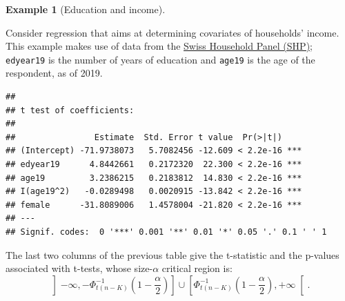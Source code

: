 \documentclass[
  12pt,
]{book}
\newenvironment{Shaded}{\begin{snugshade}}{\end{snugshade}}
\newcommand{\AttributeTok}[1]{\textcolor[rgb]{0.13,0.29,0.53}{#1}}
\newcommand{\DecValTok}[1]{\textcolor[rgb]{0.00,0.00,0.81}{#1}}
\newcommand{\FunctionTok}[1]{\textcolor[rgb]{0.13,0.29,0.53}{\textbf{#1}}}
\newcommand{\NormalTok}[1]{#1}
\newcommand{\OtherTok}[1]{\textcolor[rgb]{0.56,0.35,0.01}{#1}}
\newcommand{\SpecialCharTok}[1]{\textcolor[rgb]{0.81,0.36,0.00}{\textbf{#1}}}
\theoremstyle{definition}
\theoremstyle{definition}
\newtheorem{example}{Example}[chapter]
\theoremstyle{definition}
\theoremstyle{definition}
\theoremstyle{remark}
\begin{document}
\begin{example}[Education and income]
\protect\hypertarget{exm:SHP0001}{}\label{exm:SHP0001}

Consider regression that aims at determining covariates of households' income. This example makes use of data from the \href{https://forscenter.ch/projects/swiss-household-panel/}{Swiss Household Panel (SHP)}; \texttt{edyear19} is the number of years of education and \texttt{age19} is the age of the respondent, as of 2019.

\begin{Shaded}
\end{Shaded}

\begin{verbatim}
## 
## t test of coefficients:
## 
##                Estimate  Std. Error t value  Pr(>|t|)    
## (Intercept) -71.9738073   5.7082456 -12.609 < 2.2e-16 ***
## edyear19      4.8442661   0.2172320  22.300 < 2.2e-16 ***
## age19         3.2386215   0.2183812  14.830 < 2.2e-16 ***
## I(age19^2)   -0.0289498   0.0020915 -13.842 < 2.2e-16 ***
## female      -31.8089006   1.4578004 -21.820 < 2.2e-16 ***
## ---
## Signif. codes:  0 '***' 0.001 '**' 0.01 '*' 0.05 '.' 0.1 ' ' 1
\end{verbatim}

\end{example}

The last two columns of the previous table give the t-statistic and the p-values associated with t-tests, whose size-\(\alpha\) critical region is:
\[
\left]-\infty,-\Phi^{-1}_{t(n-K)}\left(1-\frac{\alpha}{2}\right)\right] \cup \left[\Phi^{-1}_{t(n-K)}\left(1-\frac{\alpha}{2}\right),+\infty\right[.
\]
\end{document}

